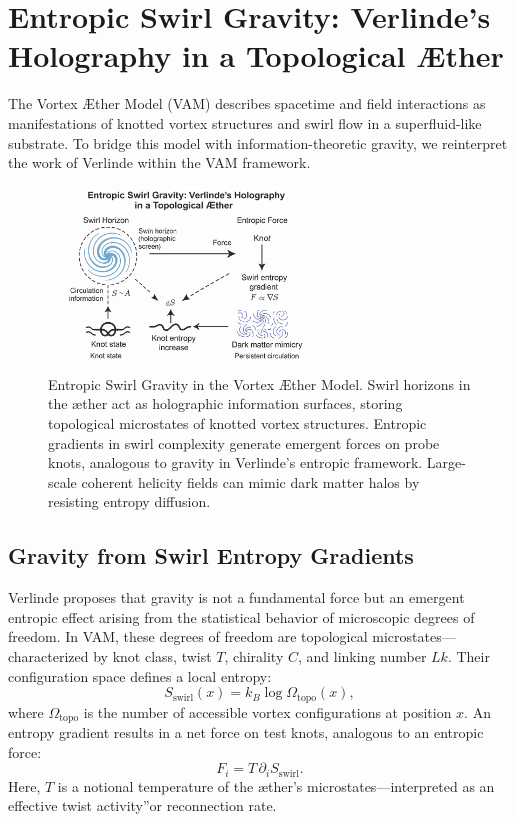 \section{Entropic Swirl Gravity: Verlinde's Holography in a Topological Æther}

The Vortex Æther Model (VAM) describes spacetime and field interactions as manifestations of knotted vortex structures and swirl flow in a superfluid-like substrate. To bridge this model with information-theoretic gravity, we reinterpret the work of Verlinde \cite{Verlinde2011,Verlinde2016} within the VAM framework.

\begin{figure}[h!]
\centering
\includegraphics[width=0.65\textwidth]{images/ErikVerlinde}
\caption{Entropic Swirl Gravity in the Vortex Æther Model.
Swirl horizons in the æther act as holographic information surfaces, storing topological microstates of knotted vortex structures. Entropic gradients in swirl complexity generate emergent forces on probe knots, analogous to gravity in Verlinde's entropic framework. Large-scale coherent helicity fields can mimic dark matter halos by resisting entropy diffusion.}
\end{figure}

\subsection*{Gravity from Swirl Entropy Gradients}

Verlinde proposes that gravity is not a fundamental force but an emergent entropic effect arising from the statistical behavior of microscopic degrees of freedom. In VAM, these degrees of freedom are topological microstates—characterized by knot class, twist $T$, chirality $C$, and linking number $Lk$. Their configuration space defines a local entropy:
\begin{equation}
S_{\text{swirl}}(x) = k_B \log \Omega_{\text{topo}}(x),
\end{equation}
where $\Omega_{\text{topo}}$ is the number of accessible vortex configurations at position $x$. An entropy gradient results in a net force on test knots, analogous to an entropic force:
\begin{equation}
F_i = T \, \partial_i S_{\text{swirl}}.
\end{equation}
Here, $T$ is a notional temperature of the æther's microstates—interpreted as an effective \grqq twist activity\textquotedblright or reconnection rate.

